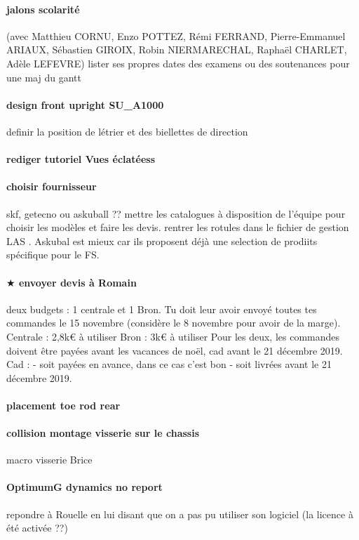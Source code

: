 \paragraph{jalons scolarité} (avec Matthieu CORNU, Enzo POTTEZ, Rémi FERRAND, Pierre-Emmanuel ARIAUX, Sébastien GIROIX, Robin NIERMARECHAL, Raphaël CHARLET, Adèle LEFEVRE) lister ses propres dates des examens ou des soutenances pour une maj du gantt
\paragraph{design front upright SU\_A1000} definir la position de létrier et des biellettes de direction 
\paragraph{rediger tutoriel Vues éclatéess} 
\paragraph{choisir fournisseur} skf, getecno ou askuball ?? mettre les catalogues à disposition de l'équipe pour choisir les modèles et faire les devis. rentrer les rotules dans le fichier de gestion LAS . Askubal est mieux car ils proposent déjà une selection de prodiits spécifique pour le FS. 
\paragraph{$\bigstar$ envoyer devis à Romain} deux budgets : 1 centrale et 1 Bron. Tu doit leur avoir envoyé toutes tes commandes le 15 novembre (considère le 8 novembre pour avoir de la marge).
Centrale : 2,8k€ à utiliser
Bron : 3k€ à utiliser
Pour les deux, les commandes doivent être payées avant les vacances de noël, cad avant le 21 décembre 2019.
Cad :
- soit payées en avance, dans ce cas c'est bon
- soit livrées avant le 21 décembre 2019.
\paragraph{placement toe rod rear} 
\paragraph{collision montage visserie sur le chassis} macro visserie Brice
\paragraph{OptimumG dynamics no report} repondre à Rouelle en lui disant que on a pas pu utiliser son logiciel (la licence à été activée ??)
